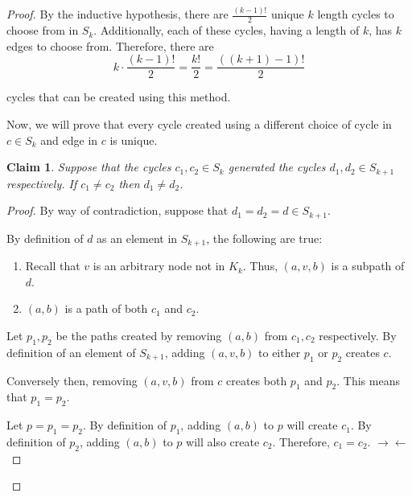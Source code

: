 \documentclass{article}
\newcommand{\contradiction}{$\rightarrow\leftarrow$}
\newtheorem{claim}{Claim}
\begin{document}
\begin{outline}[enumerate]
\begin{proof}
        By the inductive hypothesis, there are $\frac{(k - 1)!}{2}$ unique $k$ length cycles to choose from in $S_k$. Additionally, each of these cycles, having a length of $k$, has $k$ edges to choose from. Therefore, there are 
        \begin{equation}
            k \cdot \frac{(k - 1)!}{2} = \frac{k!}{2} = \frac{((k + 1) - 1)!}{2}
        \end{equation}
        
        cycles that can be created using this method.

        Now, we will prove that every cycle created using a different choice of cycle in $c \in S_k$ and edge in $c$ is unique. 

        \begin{claim}
            Suppose that the cycles $c_1, c_2 \in S_k$ generated the cycles $d_1, d_2 \in S_{k+1}$ respectively. If $c_1 \neq c_2$ then $d_1 \neq d_2$.
            \label{cl:2cneq}
        \end{claim}
        \begin{adjustwidth}{0.5cm}{0cm}

            \begin{proof}
                By way of contradiction, suppose that $d_1 = d_2 = d \in S_{k + 1}$. 

                By definition of $d$ as an element in $S_{k+1}$, the following are true:
                \begin{enumerate}
                    \item Recall that $v$ is an arbitrary node not in $K_k$. Thus, $(a, v, b)$ is a subpath of $d$.
                    \item $(a, b)$ is a path of both $c_1$ and $c_2$.
                \end{enumerate}

                Let $p_1, p_2$ be the paths created by removing $(a, b)$ from $c_1, c_2$ respectively. By definition of an element of $S_{k+1}$, adding $(a, v, b)$ to either $p_1$ or $p_2$ creates $c$. 
                
                Conversely then, removing $(a, v, b)$ from $c$ creates both $p_1$ and $p_2$. This means that $p_1 = p_2$. 
                
                Let $p = p_1 = p_2$. By definition of $p_1$, adding $(a, b)$ to $p$ will create $c_1$. By definition of $p_2$, adding $(a, b)$ to $p$ will also create $c_2$. Therefore, $c_1 = c_2$. \contradiction


\end{proof}
\end{adjustwidth}
\end{proof}
\end{outline}
\end{document}
